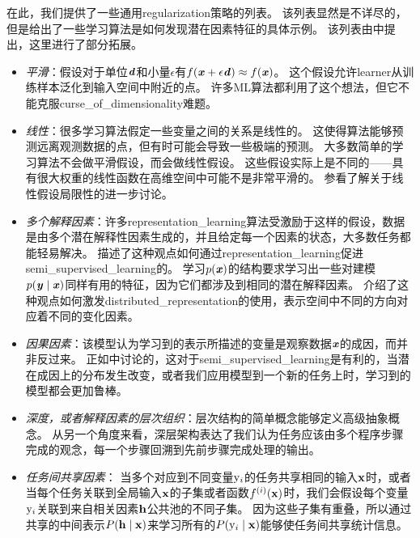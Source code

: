 在此，我们提供了一些通用\gls{regularization}策略的列表。
该列表显然是不详尽的，但是给出了一些学习算法是如何发现潜在因素特征的具体示例。
该列表由\cite{Bengio-Courville-Vincent-TPAMI-2012}中提出，这里进行了部分拓展。
\begin{itemize}
	\item \emph{平滑}：假设对于单位$\boldsymbol{\mathit{d}}$和小量$\epsilon$有$f(\boldsymbol{\mathit{x}} + \epsilon \boldsymbol{\mathit{d}}) \approx f(\boldsymbol{\mathit{x}})$。
	这个假设允许\gls{learner}从训练样本泛化到输入空间中附近的点。
	许多\gls{ML}算法都利用了这个想法，但它不能克服\gls{curse_of_dimensionality}难题。


	\item \emph{线性}：很多学习算法假定一些变量之间的关系是线性的。
	这使得算法能够预测远离观测数据的点，但有时可能会导致一些极端的预测。
	大多数简单的学习算法不会做平滑假设，而会做线性假设。
	这些假设实际上是不同的——具有很大权重的线性函数在高维空间中可能不是非常平滑的。
	参看\cite{Goodfellow-2015-adversarial}了解关于线性假设局限性的进一步讨论。


	\item \emph{多个解释因素}：许多\gls{representation_learning}算法受激励于这样的假设，数据是由多个潜在解释性因素生成的，并且给定每一个因素的状态，大多数任务都能轻易解决。
	描述了这种观点如何通过\gls{representation_learning}促进\gls{semi_supervised_learning}的。
	学习$p(\boldsymbol{\mathit{x}})$的结构要求学习出一些对建模$p(\boldsymbol{\mathit{y}}\mid\boldsymbol{\mathit{x}})$同样有用的特征，因为它们都涉及到相同的潜在解释因素。
	介绍了这种观点如何激发\gls{distributed_representation}的使用，表示空间中不同的方向对应着不同的变化因素。


	\item \emph{因果因素}：该模型认为学习到的表示所描述的变量是观察数据$\boldsymbol{\mathit{x}}$的成因，而并非反过来。
	正如中讨论的，这对于\gls{semi_supervised_learning}是有利的，当潜在成因上的分布发生改变，或者我们应用模型到一个新的任务上时，学习到的模型都会更加鲁棒。


	\item \emph{深度，或者解释因素的层次组织}：层次结构的简单概念能够定义高级抽象概念。
	从另一个角度来看，深层架构表达了我们认为任务应该由多个程序步骤完成的观念，每一个步骤回溯到先前步骤完成处理的输出。


	\item \emph{任务间共享因素}：
	当多个对应到不同变量$\mathrm{y}_i$的任务共享相同的输入$\mathbf{x}$时，或者当每个任务关联到全局输入$\mathbf{x}$的子集或者函数$f^{(i)}(\mathbf{x})$时，我们会假设每个变量$\mathrm{y}_i$关联到来自相关因素$\mathbf{h}$公共池的不同子集。
	因为这些子集有重叠，所以通过共享的中间表示$ P(\mathbf{h} \mid \mathbf{x})$来学习所有的$P(\mathrm{y}_i \mid \mathbf{x})$能够使任务间共享统计信息。



\end{itemize}
